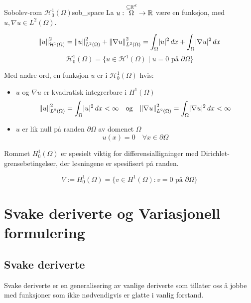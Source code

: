 \begin{definition}{Sobolev-rom $\mathcal{H}_0^1(\Omega)$}{sob_space}
	La $u:\overset{\subseteq \R^d}{\Omega} \to \R$ være en funksjon, med $u, \nabla u \in L^2(\Omega)$.

	\begin{equation}
		\norm*{u}_{\mathcal{H}^1(\Omega)}^2 = \norm*{u}_{L^2(\Omega)}^2 + \norm*{\nabla u}_{L^2(\Omega)}^2
		= \int_\Omega \abs{u}^2 \, dx + \int_\Omega \abs{\nabla u}^2 \, dx
	\end{equation}
	\begin{equation}
		\mathcal{H}_0^1(\Omega) = \{u \in \mathcal{H}^1(\Omega) \mid u = 0 \text{ på } \partial \Omega\}
	\end{equation}

	Med andre ord, en funksjon $u$ er i $\mathcal{H}^1_0(\Omega)$ hvis:
	\begin{itemize}
		\item $u$ og $\nabla u$ er kvadratisk integrerbare i $H^1(\Omega)$
		      \begin{equation}
			      \norm*{u}_{L^2(\Omega)}^2 = \int_\Omega \abs{u}^2 \, dx < \infty \quad \text{og} \quad \norm*{\nabla u}_{L^2(\Omega)}^2 = \int_\Omega \abs{\nabla u}^2 \, dx < \infty
		      \end{equation}
		\item $u$ er lik null på randen $\partial \Omega$ av domenet $\Omega$
		      \begin{equation}
			      u(x) = 0 \quad \forall x \in \partial \Omega
		      \end{equation}
	\end{itemize}
\end{definition}

Rommet $H^1_0(\Omega)$ er spesielt viktig for differensialligninger med Dirichlet-grensebetingelser, der løsningene er spesifisert på randen.

\begin{equation}
	V := H^1_0(\Omega) = \{ v \in H^1(\Omega) : v = 0 \text{ på } \partial\Omega \}
\end{equation}

\section{Svake deriverte og Variasjonell formulering}
\subsection{Svake deriverte}
Svake deriverte er en generalisering av vanlige deriverte som tillater oss å jobbe med funksjoner som ikke nødvendigvis er glatte i vanlig forstand.

